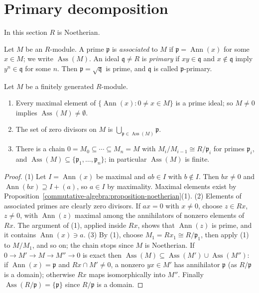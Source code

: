 \section{Primary decomposition}\label{commutative-algebra:section-primary}

In this section $R$ is Noetherian.

\begin{definition}\label{commutative-algebra:definition-associated-primary}
Let $M$ be an $R$-module. A prime $\mathfrak{p}$ is \emph{associated} to $M$ if $\mathfrak{p} = \operatorname{Ann}(x)$ for some $x \in M$; we write
$\operatorname{Ass}(M)$. An ideal $\mathfrak{q} \neq R$ is \emph{primary} if $xy \in \mathfrak{q}$ and $x \notin \mathfrak{q}$ imply $y^n \in \mathfrak{q}$ for
some $n$. Then $\mathfrak{p} = \sqrt{\mathfrak{q}}$ is prime, and $\mathfrak{q}$ is called $\mathfrak{p}$-primary.
\end{definition}

\begin{proposition}\label{commutative-algebra:proposition-associated-primes}
Let $M$ be a finitely generated $R$-module.
\begin{enumerate}
\item Every maximal element of $\{\operatorname{Ann}(x) : 0 \neq x \in M\}$ is a prime ideal; so $M \neq 0$ implies $\operatorname{Ass}(M) \neq \emptyset$.
\item The set of zero divisors on $M$ is $\bigcup_{\mathfrak{p} \in \operatorname{Ass}(M)}\mathfrak{p}$.
\item There is a chain $0 = M_0 \subseteq \cdots \subseteq M_n = M$ with $M_i/M_{i-1} \cong R/\mathfrak{p}_i$ for primes $\mathfrak{p}_i$, and
$\operatorname{Ass}(M) \subseteq \{\mathfrak{p}_1, \ldots, \mathfrak{p}_n\}$; in particular $\operatorname{Ass}(M)$ is finite.
\end{enumerate}
\end{proposition}

\begin{proof}
(1) Let $I = \operatorname{Ann}(x)$ be maximal and $ab \in I$ with $b \notin I$. Then $bx \neq 0$ and $\operatorname{Ann}(bx) \supseteq I + (a)$, so
$a \in I$ by maximality. Maximal elements exist by Proposition~\ref{commutative-algebra:proposition-noetherian}(1).
(2) Elements of associated primes are clearly zero divisors. If $ax = 0$ with $x \neq 0$, choose $z \in Rx$, $z \neq 0$, with
$\operatorname{Ann}(z)$ maximal among the annihilators of nonzero elements of $Rx$. The argument of (1), applied inside $Rx$, shows
that $\operatorname{Ann}(z)$ is prime, and it contains $\operatorname{Ann}(x) \ni a$.
(3) By (1), choose $M_1 = Rx_1 \cong R/\mathfrak{p}_1$, then apply (1) to $M/M_1$, and so on; the chain stops since $M$ is
Noetherian. If $0 \to M' \to M \to M'' \to 0$ is exact then $\operatorname{Ass}(M) \subseteq \operatorname{Ass}(M') \cup \operatorname{Ass}(M'')$: if
$\operatorname{Ann}(x) = \mathfrak{p}$ and $Rx \cap M' \neq 0$, a nonzero $yx \in M'$ has annihilator $\mathfrak{p}$ (as $R/\mathfrak{p}$ is a domain); otherwise $Rx$
maps isomorphically into $M''$. Finally $\operatorname{Ass}(R/\mathfrak{p}) = \{\mathfrak{p}\}$ since $R/\mathfrak{p}$ is a domain.
\end{proof}

